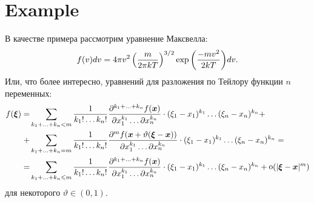 \section*{Example}

В качестве примера рассмотрим уравнение Максвелла:
\begin{equation}
f(v) dv = 4 \pi v^2 \left(\frac{m}{2 \pi kT}\right)^{3/2} \exp{\left(\frac{-mv^2}{2kT}\right)} dv.
\end{equation}
Или, что более интересно, уравнений для разложения по Тейлору функции $n$ переменных:
\begin{equation}
\begin{aligned}
    f(\mbox{\boldmath $\xi$}) = 
        & \sum_{k_1 + \ldots + k_n < m} 
            \frac{1}{k_1! \ldots k_n!}
            \frac{\partial^{k_1 + \ldots + k_n} f(\mbox{\boldmath $x$})}
            {\partial x_1^{k_1} \ldots \partial x_n^{k_n}} 
            \cdot
            (\xi_1 - x_1)^{k_1} \ldots (\xi_n - x_n)^{k_n} + \\
        + & \sum_{k_1 + \ldots + k_n = m} 
            \frac{1}{k_1! \ldots k_n!}
            \frac{\partial^{m} f(\mbox{\boldmath $x$} + \vartheta(\mbox{\boldmath $\xi$} - \mbox{\boldmath $x$}))}
            {\partial x_1^{k_1} \ldots \partial x_n^{k_n}} 
            \cdot
            (\xi_1 - x_1)^{k_1} \ldots (\xi_n - x_n)^{k_n} = \\
        = & \sum_{k_1 + \ldots + k_n \leqslant m} 
            \frac{1}{k_1! \ldots k_n!}
            \frac{\partial^{k_1 + \ldots + k_n} f(\mbox{\boldmath $x$})}
            {\partial x_1^{k_1} \ldots \partial x_n^{k_n}} 
            \cdot
            (\xi_1 - x_1)^{k_1} \ldots (\xi_n - x_n)^{k_n} + \mathop{\mathrm{o}}\nolimits(|\mbox{\boldmath $\xi$} - \mbox{\boldmath $x$}|^m)
\end{aligned}
\end{equation}
для некоторого $\vartheta \in (0, 1)$.